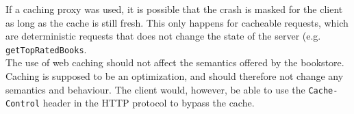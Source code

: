 \documentclass[11pt]{article}
\begin{document}
If a caching proxy was used, it is possible that the crash is masked for the client as long as the cache is still fresh. This only happens for cacheable requests, which are deterministic requests that does not change the state of the server (e.g. \texttt{getTopRatedBooks}.\\

The use of web caching should not affect the semantics offered by the bookstore. Caching is supposed to be an optimization, and should therefore not change any semantics and behaviour. The client would, however, be able to use the \texttt{Cache-Control} header in the HTTP protocol to bypass the cache.\\
\end{document}
